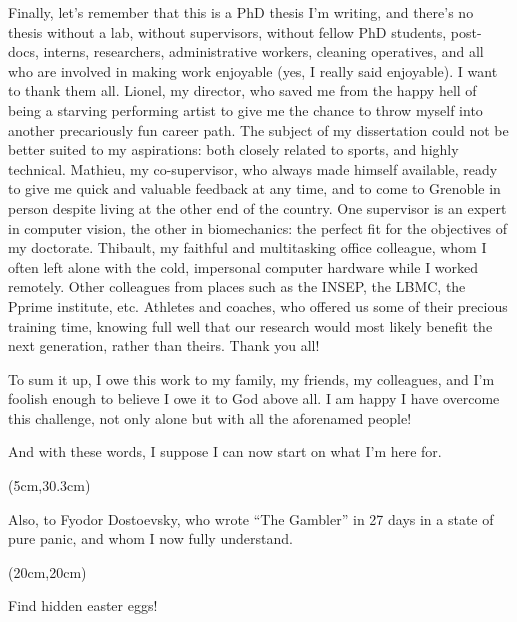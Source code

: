 Finally, let’s remember that this is a PhD thesis I’m writing, and there’s no thesis without a lab, without supervisors, without fellow PhD students, post-docs, interns, researchers, administrative workers, cleaning operatives, and all who are involved in making work enjoyable (yes, I really said enjoyable). I want to thank them all. Lionel, my director, who saved me from the happy hell of being a starving performing artist to give me the chance to throw myself into another precariously fun career path. The subject of my dissertation could not be better suited to my aspirations: both closely related to sports, and highly technical. Mathieu, my co-supervisor, who always made himself available, ready to give me quick and valuable feedback at any time, and to come to Grenoble in person despite living at the other end of the country. One supervisor is an expert in computer vision, the other in biomechanics: the perfect fit for the objectives of my doctorate. Thibault, my faithful and multitasking office colleague, whom I often left alone with the cold, impersonal computer hardware while I worked remotely. Other colleagues from places such as the INSEP, the LBMC, the Pprime institute, etc. Athletes and coaches, who offered us some of their precious training time, knowing full well that our research would most likely benefit the next generation, rather than theirs. Thank you all!

To sum it up, I owe this work to my family, my friends, my colleagues, and I’m foolish enough to believe I owe it to God above all. I am happy I have overcome this challenge, not only alone but with all the aforenamed people!

And with these words, I suppose I can now start on what I’m here for.

\begin{textblock*}{10cm}(5cm,30.3cm) %
      \begin{turn}{0} 
      \scriptsize Also, to Fyodor Dostoevsky, who wrote “The Gambler” in 27 days in a state of pure panic, and whom I now fully understand. \newline
      \end{turn}
\end{textblock*}

\begin{textblock*}{10cm}(20cm,20cm) %
      \begin{turn}{90} 
            \normalsize \emojiegg
            \scriptsize Find hidden easter eggs! 
      \end{turn}
\end{textblock*}